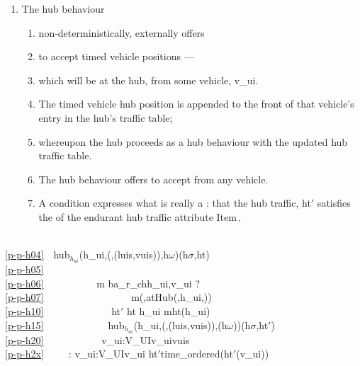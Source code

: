{\begin{enumerate}\setei
\item \label{p-p-h04} The hub behaviour 
\begin{enumerate}
\item \label{p-p-h05} non-deterministically, externally  offers 
\item \label{p-p-h06} to accept timed vehicle positions ---
\item \label{p-p-h07} which will be at the hub, from some vehicle,
                    \textsf{v\_ui}.  
\item \label{p-p-h10} The timed vehicle hub position is appended to the
                    front of that vehicle's entry in the hub's traffic
                    table; 
\item \label{p-p-h15} whereupon the hub proceeds as a hub behaviour with 
                    the updated hub traffic table.
\item \label{p-p-h20} The hub behaviour offers to accept from any vehicle.
\item \label{p-p-h2x} A  condition expresses what is really a
                    : that the \textsf{hub
                    traffic, ht$'$} satisfies the  of the
                    endurant hub traffic attribute Item\,. 
\end{enumerate}
\savei\end{enumerate}
\bp
{}\\
\ref{p-p-h04}\ \ hub$_{h_{ui}}$(h\_ui,({\it },(luis,vuis)),h$\omega$)(h$\sigma$,ht) {\IS}\\
\ref{p-p-h05}\ \ \ \ \ \ {\DETCHOICE}\\
\ref{p-p-h06}\ \ \ \ \ \ \ \ \ \ {\LBRACE}  m {\EQ} ba\_r\_ch{\LBRACKET}h\_ui,v\_ui{\RBRACKET} ? \ \ \\
\ref{p-p-h07}\ \ \ \ \ \ \ \ \ \ \ \ \ \ \ \ \  m{\EQ}({\UNDERLINE},atHub({\UNDERLINE},h\_ui,{\UNDERLINE}))\\
\ref{p-p-h10}\ \ \ \ \ \ \ \ \ \ \ \ \  ht$'$ {\EQ} ht {\DAGGER} {\LBRACKET}h\_ui {\MAPSTO} {\LANGLE}m{\RANGLE}{\CONCAT}ht(h\_ui){\RBRACKET} \\
\ref{p-p-h15}\ \ \ \ \ \ \ \ \ \ \ \ \ hub$_{h_{ui}}$(h\_ui,({\it },(luis,vuis)),(h$\omega$))(h$\sigma$,ht$'$)\\
\ref{p-p-h20}\ \ \ \ \ \ \ \ \ \ \ {\BAR} v\_ui:V\_UI{\RDOT}v\_ui{\ISIN}vuis   {\RBRACE}\\
\ref{p-p-h2x}\ \ \ \ \ : {\ALL} v\_ui:V\_UI{\RDOT}v\_ui {\ISIN}  ht$'${\DBLRIGHTARROW}time\_ordered(ht$'$(v\_ui)) 
\ep
\emcii

}
